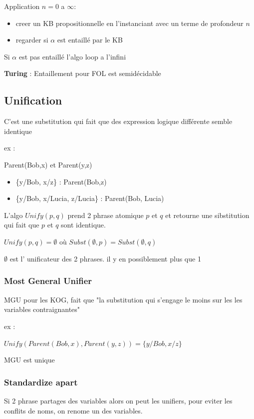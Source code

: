 			Application $n=0$ a $\infty$:
			\begin{itemize}
				\item creer un KB propositionnelle en l'instanciant avec un terme de profondeur $n$
				\item regarder si $\alpha$ est entaillé par le KB
			\end{itemize}
			
			Si $\alpha$ est pas entaillé l'algo loop a l'infini
			
			\textbf{Turing} : Entaillement pour FOL est semidécidable
			
	\subsection{Unification}
		C'est une substitution qui fait que des expression logique différente semble identique
		
		ex : 
		
		Parent(Bob,x) et Parent(y,z)
		\begin{itemize}
			\item \{y/Bob, x/z\} : Parent(Bob,z)
			\item \{y/Bob, x/Lucia, z/Lucia\} : Parent(Bob, Lucia)
		\end{itemize}	
		
		L'algo $Unify(p,q)$ prend 2 phrase atomique $p$ et $q$ et retourne une sibstitution qui fait que $p$ et $q$ sont identique.
		
		$Unify(p,q) = \emptyset$ où $Subst(\emptyset, p) = Subst(\emptyset, q)$
		
		$\emptyset$ est l' unificateur des 2 phrases. il y en possiblement plus que 1
		
		\subsubsection{Most General Unifier}
			MGU pour les KOG, fait que "la substitution qui s'engage le moins sur les les variables contraignantes"
			
			ex : 
			
			$Unify(Parent(Bob,x),Parent(y,z)) = \{y/Bob, x/z\}$
			
			MGU est unique
			
		
		\subsubsection{Standardize apart}
			Si 2 phrase partages des variables alors on peut les unifiers, pour eviter les conflits de noms, on renome un des variables.
			
